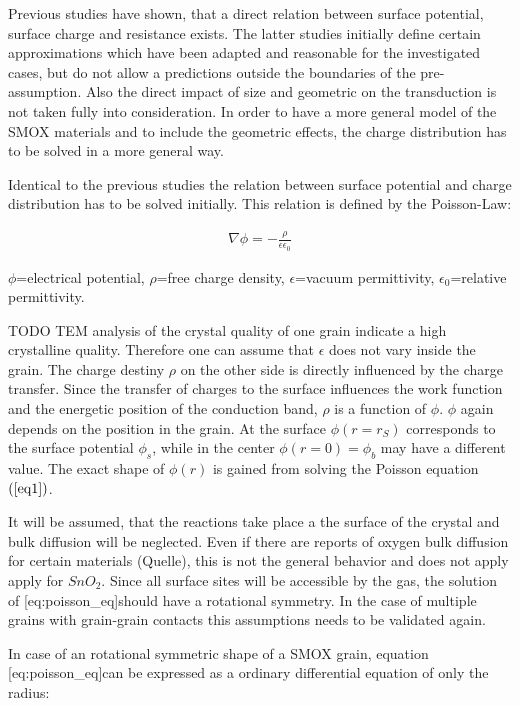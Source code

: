\documentclass[11pt]{article}
\begin{document}
Previous studies have shown, that a direct relation between surface
potential, surface charge and resistance exists. The latter studies
initially define certain approximations which have been adapted and
reasonable for the investigated cases, but do not allow a predictions
outside the boundaries of the pre-assumption. Also the direct impact of
size and geometric on the transduction is not taken fully into
consideration. In order to have a more general model of the SMOX
materials and to include the geometric effects, the charge distribution
has to be solved in a more general way.

Identical to the previous studies the relation between surface potential
and charge distribution has to be solved initially. This relation is
defined by the Poisson-Law:

\begin{align}
\nabla\phi=-\frac{\rho}{\epsilon\epsilon_{0}} \label{eq1}\tag{Poisson}
\end{align}

\(\phi\)=electrical potential, \(\rho\)=free charge density,
\(\epsilon\)=vacuum permittivity, \(\epsilon_{0}\)=relative
permittivity.

TODO TEM analysis of the crystal quality of one grain indicate a high
crystalline quality. Therefore one can assume that \(\epsilon\) does not
vary inside the grain. The charge destiny \(\rho\) on the other side is
directly influenced by the charge transfer. Since the transfer of
charges to the surface influences the work function and the energetic
position of the conduction band, \(\rho\) is a function of \(\phi\).
\(\phi\) again depends on the position in the grain. At the surface
\(\phi(r=r_{S})\) corresponds to the surface potential \(\phi_s\), while
in the center \(\phi(r=0)=\phi_b\) may have a different value. The exact
shape of \(\phi(r)\) is gained from solving the Poisson equation
\((\ref{eq1})\).

It will be assumed, that the reactions take place a the surface of the
crystal and bulk diffusion will be neglected. Even if there are reports
of oxygen bulk diffusion for certain materials (Quelle), this is not the
general behavior and does not apply apply for \(SnO_{2}\). Since all
surface sites will be accessible by the gas, the solution of
{[}eq:poisson\_eq{]}should have a rotational symmetry. In the case of
multiple grains with grain-grain contacts this assumptions needs to be
validated again.

In case of an rotational symmetric shape of a SMOX grain, equation
{[}eq:poisson\_eq{]}can be expressed as a ordinary differential equation
of only the radius:
\end{document}
